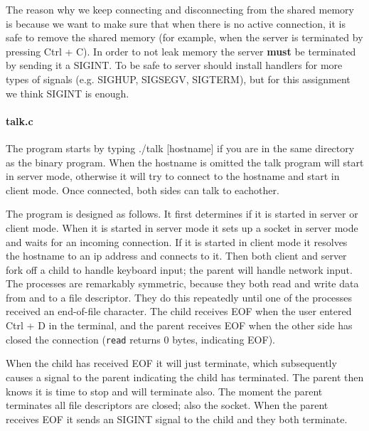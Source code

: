 \documentclass[a4paper,10pt]{article}
\begin{document}
The reason why we keep connecting and disconnecting from the shared memory is because we want to make sure that when there is no active connection, it is safe to remove the shared memory (for example, when the server is terminated by pressing Ctrl + C). In order to not leak memory the server \textbf{must} be terminated by sending it a SIGINT. To be safe to server should install handlers for more types of signals (e.g. SIGHUP, SIGSEGV, SIGTERM), but for this assignment we think SIGINT is enough.

\paragraph{talk.c} The program starts by typing ./talk [hostname] if you are in the same directory as the binary program. When the hostname is omitted the talk program will start in server mode, otherwise it will try to connect to the hostname and start in client mode. Once connected, both sides can talk to eachother.

The program is designed as follows. It first determines if it is started in server or client mode. When it is started in server mode it sets up a socket in server mode and waits for an incoming connection. If it is started in client mode it resolves the hostname to an ip address and connects to it. Then both client and server fork off a child to handle keyboard input; the parent will handle network input. The processes are remarkably symmetric, because they both read and write data from and to a file descriptor. They do this repeatedly until one of the processes received an end-of-file character. The child receives EOF when the user entered Ctrl + D in the terminal, and the parent receives EOF when the other side has closed the connection (\texttt{read} returns 0 bytes, indicating EOF).

When the child has received EOF it will just terminate, which subsequently causes a signal to the parent indicating the child has terminated. The parent then knows it is time to stop and will terminate also. The moment the parent terminates all file descriptors are closed; also the socket. When the parent receives EOF it sends an SIGINT signal to the child and they both terminate.
\end{document}
